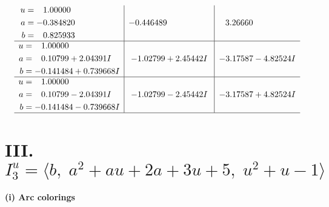 \documentclass[1p]{elsarticle_modified}
\theoremstyle{definition}
\begin{document}
$$\begin{array}{c|c|c}
\begin{aligned}
u &= \phantom{-}1.00000\phantom{ +0.000000I} \\
a &= -0.384820\phantom{ +0.000000I} \\
b &= \phantom{-}0.825933\phantom{ +0.000000I}\end{aligned}
 & -0.446489\phantom{ +0.000000I} & \phantom{-}3.26660\phantom{ +0.000000I} \\ \hline\begin{aligned}
u &= \phantom{-}1.00000\phantom{ +0.000000I} \\
a &= \phantom{-}0.10799 + 2.04391 I \\
b &= -0.141484 + 0.739668 I\end{aligned}
 & -1.02799 + 2.45442 I & -3.17587 - 4.82524 I \\ \hline\begin{aligned}
u &= \phantom{-}1.00000\phantom{ +0.000000I} \\
a &= \phantom{-}0.10799 - 2.04391 I \\
b &= -0.141484 - 0.739668 I\end{aligned}
 & -1.02799 - 2.45442 I & -3.17587 + 4.82524 I\\
 \hline 
 \end{array}$$\newpage\newpage\renewcommand{\arraystretch}{1}
\centering \section*{III. $I^u_{3}= \langle b,\;a^2+a u+2 a+3 u+5,\;u^2+u-1 \rangle$}
\flushleft \textbf{(i) Arc colorings}\\
\end{document}
